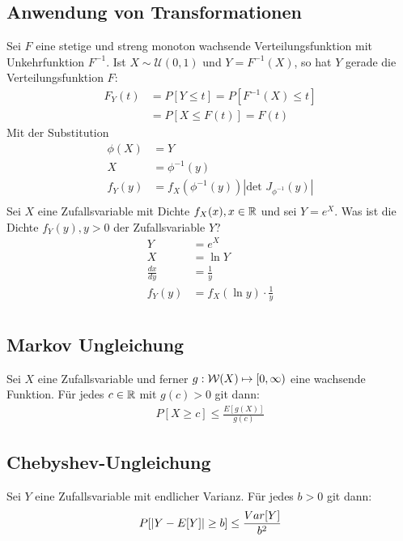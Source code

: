 \subsection*{Anwendung von Transformationen}
Sei $F$ eine stetige und streng monoton wachsende Verteilungsfunktion mit
Unkehrfunktion $F^{-1}$. Ist $X \sim \mathcal{U} (0, 1)$ und $Y = F^{-1} (X)$,
so hat $Y$ gerade die Verteilungsfunktion $F$:
\begin{align*}
  F_Y (t) & = P[Y \leq t] = P[F^{-1} (X) \leq t] \\
          & = P[X \leq F (t)] = F (t)
\end{align*}
Mit der Substitution
\begin{align*}
  \phi(X) &= Y\\
  X &= \phi^{-1}(y)\\
  f_Y(y) &= f_X(\phi^{-1}(y))|\text{det }J_{\phi^{-1}}(y)|\\
\end{align*}
\BoxStart{}
Sei $X$ eine Zufallsvariable mit Dichte $f_X(x), x \in \mathbb{R}$ und sei $Y = e^X$. Was ist die Dichte $f_Y(y), y > 0$ der Zufallsvariable $Y$?
\begin{align*}
  Y &= e^X\\
  X &= \ln Y\\
  \frac{dx}{dy} &= \frac{1}{y}\\
  f_Y(y) &= f_X(\ln y) \cdot \frac{1}{y}\\
\end{align*}
\BoxEnd{}
\subsection*{Markov Ungleichung}
Sei $X$ eine Zufallsvariable und ferner $g : \mathcal{W} (X) \mapsto [0, \infty)$ eine
wachsende Funktion. Für jedes $c \in \mathbb{R}$ mit $g (c) > 0$ git dann:
\begin{align*}
  P[X \geq c] \leq \frac{E[g (X)]}{g (c)}
\end{align*}
\subsection*{Chebyshev-Ungleichung}
Sei $Y$ eine Zufallsvariable mit endlicher Varianz. Für jedes $b > 0$ git dann:
\begin{align*}
  P[\abs{Y - E[Y]} \geq b] \leq \frac{Var[Y]}{b^2}
\end{align*}
